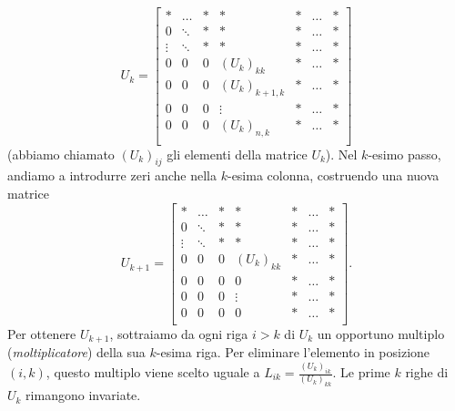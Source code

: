 \documentclass[a4paper]{report}
\theoremstyle{definition}
\theoremstyle{remark}
\begin{document}
\[
U_k = \begin{bmatrix}
    \ast & \dots & \ast & \ast & \ast & \dots & \ast\\
    0 & \ddots & \ast& \ast & \ast& \dots & \ast\\
    \vdots & \ddots & \ast & \ast& \ast & \dots & \ast\\
    0& 0  &0 & (U_k)_{kk} & \ast & \dots & \ast\\
    0& 0  &0 & (U_k)_{k+1,k} & \ast & \dots & \ast\\
    0& 0  &0 & \vdots & \ast & \dots & \ast\\
    0& 0  &0 & (U_k)_{n,k} & \ast & \dots & \ast\\
\end{bmatrix}
\]
(abbiamo chiamato $(U_k)_{ij}$ gli elementi della matrice $U_k$).
Nel $k$-esimo passo, andiamo a introdurre zeri anche nella $k$-esima colonna, costruendo una nuova matrice 
\[
U_{k+1} = \begin{bmatrix}
    \ast & \dots & \ast & \ast & \ast & \dots & \ast\\
    0 & \ddots & \ast& \ast & \ast& \dots & \ast\\
    \vdots & \ddots & \ast & \ast& \ast & \dots & \ast\\
    0& 0  &0 & (U_k)_{kk} & \ast & \dots & \ast\\
    0& 0  &0 & 0 & \ast & \dots & \ast\\
    0& 0  &0 & \vdots & \ast & \dots & \ast\\
    0& 0  &0 & 0 & \ast & \dots & \ast\\
\end{bmatrix}.
\]
Per ottenere $U_{k+1}$, sottraiamo da ogni riga $i>k$ di $U_k$ un opportuno multiplo (\emph{moltiplicatore}) della sua $k$-esima riga. Per eliminare l'elemento in posizione $(i,k)$, questo multiplo viene scelto uguale a $L_{ik} = \frac{(U_k)_{ik}}{(U_k)_{kk}}$. Le prime $k$ righe di $U_k$ rimangono invariate.
\end{document}
